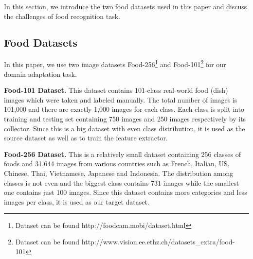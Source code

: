 In this section, we introduce the two food datasets used in this paper and discuss the challenges of food recognition task.
\subsection{Food Datasets}
 In this paper, we use two image datasets Food-256\footnote{Dataset can be found http://foodcam.mobi/dataset.html} \cite{kawano14c} and Food-101\footnote{Dataset can be found http://www.vision.ee.ethz.ch/datasets\_extra/food-101} \cite{bossard2014food} for our domain adaptation task.

\textbf{Food-101 Dataset.}
This dataset contains 101-class real-world food (dish) images which were taken and labeled manually. The total number of images is 101,000 and there are exactly 1,000 images for each class. Each class is split into training and testing set containing 750 images and 250 images respectively by its collector. Since this is a big dataset with even class distribution, it is used as the source dataset as well as to train the feature extractor.

\textbf{Food-256 Dataset.}
This is a relatively small dataset containing 256 classes of foods and 31,644 images from various countries such as French, Italian, US, Chinese, Thai, Vietnamese, Japanese and Indonesia. The distribution among classes is not even and the biggest class contains 731 images while the smallest one contains just 100 images. Since this dataset contains more categories and less images per class, it is used as our target dataset.

